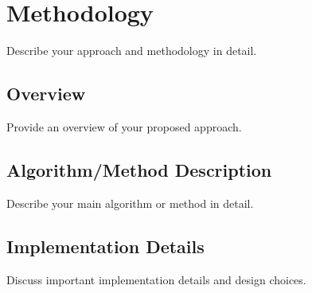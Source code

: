 \section{Methodology}
\label{sec:methodology}

Describe your approach and methodology in detail.

\subsection{Overview}
\label{subsec:overview}

Provide an overview of your proposed approach.

\subsection{Algorithm/Method Description}
\label{subsec:algorithm}

Describe your main algorithm or method in detail.

\subsection{Implementation Details}
\label{subsec:implementation}

Discuss important implementation details and design choices.

